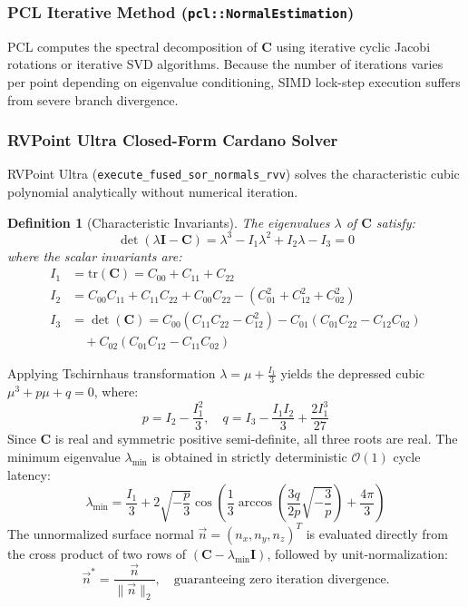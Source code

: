 \documentclass[journal,compsoc]{IEEEtran}
\newtheorem{definition}{Definition}
\begin{document}
\subsubsection{PCL Iterative Method (\texttt{pcl::NormalEstimation})}
PCL computes the spectral decomposition of $\mathbf{C}$ using iterative cyclic Jacobi rotations or iterative SVD algorithms. Because the number of iterations varies per point depending on eigenvalue conditioning, SIMD lock-step execution suffers from severe branch divergence.

\subsubsection{RVPoint Ultra Closed-Form Cardano Solver}
RVPoint Ultra (\texttt{execute\_fused\_sor\_normals\_rvv}) solves the characteristic cubic polynomial analytically without numerical iteration.
\begin{definition}[Characteristic Invariants]
The eigenvalues $\lambda$ of $\mathbf{C}$ satisfy:
\begin{equation}
\det(\lambda \mathbf{I} - \mathbf{C}) = \lambda^3 - I_1 \lambda^2 + I_2 \lambda - I_3 = 0
\label{eq:characteristic_eq}
\end{equation}
where the scalar invariants are:
\begin{align}
I_1 &= \text{tr}(\mathbf{C}) = C_{00} + C_{11} + C_{22} \\
I_2 &= C_{00}C_{11} + C_{11}C_{22} + C_{00}C_{22} - (C_{01}^2 + C_{12}^2 + C_{02}^2) \\
I_3 &= \det(\mathbf{C}) = C_{00}(C_{11}C_{22} - C_{12}^2) - C_{01}(C_{01}C_{22} - C_{12}C_{02}) \nonumber \\
    &\quad + C_{02}(C_{01}C_{12} - C_{11}C_{02})
\end{align}
\end{definition}

Applying Tschirnhaus transformation $\lambda = \mu + \frac{I_1}{3}$ yields the depressed cubic $\mu^3 + p\mu + q = 0$, where:
\begin{equation}
p = I_2 - \frac{I_1^2}{3}, \quad q = I_3 - \frac{I_1 I_2}{3} + \frac{2 I_1^3}{27}
\end{equation}
Since $\mathbf{C}$ is real and symmetric positive semi-definite, all three roots are real. The minimum eigenvalue $\lambda_{\min}$ is obtained in strictly deterministic $\mathcal{O}(1)$ cycle latency:
\begin{equation}
\lambda_{\min} = \frac{I_1}{3} + 2 \sqrt{-\frac{p}{3}} \cos\left( \frac{1}{3} \arccos\left( \frac{3q}{2p} \sqrt{-\frac{3}{p}} \right) + \frac{4\pi}{3} \right)
\label{eq:cardano_root}
\end{equation}
The unnormalized surface normal $\vec{n} = (n_x, n_y, n_z)^T$ is evaluated directly from the cross product of two rows of $(\mathbf{C} - \lambda_{\min} \mathbf{I})$, followed by unit-normalization:
\begin{equation}
\vec{n}^* = \frac{\vec{n}}{\|\vec{n}\|_2}, \quad \text{guaranteeing zero iteration divergence.}
\end{equation}
\end{document}
